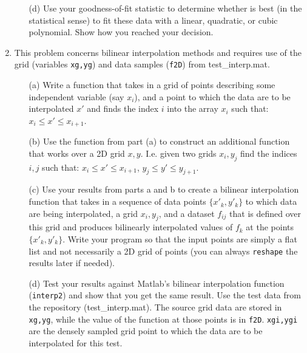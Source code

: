 \documentclass{article}
\begin{document}
\begin{enumerate}
\begin{itemize}
    \item[(d)] Use your goodness-of-fit statistic to determine whether is best (in the statistical sense) to fit these data with a linear, quadratic, or cubic polynomial.  Show how you reached your decision.  
  \end{itemize}
  \item This problem concerns bilinear interpolation methods and requires use of the grid (variables \texttt{xg,yg}) and data samples (\texttt{f2D}) from \textsf{test\_interp.mat}.  
  \begin{itemize}
    \item[(a)]  Write a function that takes in a grid of points describing some independent variable (say $x_i$), and a point to which the data are to be interpolated $x'$ and finds the index $i$ into the array $x_i$ such that:  $x_i \le x' \le x_{i+1}$.  
    \item[(b)]  Use the function from part (a) to construct an additional function that works over a 2D grid $x,y$.  I.e. given two grids $x_i,y_j$ find the indices $i,j$ such that:  $x_i \le x' \le x_{i+1}$, $y_j \le y' \le y_{j+1}$.
    \item[(c)]  Use your results from parts a and b to create a bilinear interpolation function that takes in a sequence of data points $\{x'_k,y'_k\}$ to which data are being interpolated, a grid $x_i,y_j$, and a dataset $f_{ij}$ that is defined over this grid and produces bilinearly interpolated values of $f_k$ at the points $\{x'_k,y'_k\}$.  Write your program so that the input points are simply a flat list and not necessarily a 2D grid of points (you can always \texttt{reshape} the results later if needed).  
    \item[(d)]  Test your results against Matlab's bilinear interpolation function (\texttt{interp2}) and show that you get the same result.  Use the test data from the repository (\textsf{test\_interp.mat}).  The source grid data are stored in \texttt{xg,yg}, while the value of the function at those points is in \texttt{f2D}.  \texttt{xgi,ygi} are the densely sampled grid point to which the data are to be interpolated for this test.  
  \end{itemize} 
\end{enumerate}
\end{document}
